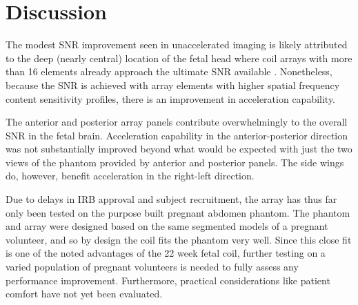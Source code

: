 \chapter{Discussion}
The modest SNR improvement seen in unaccelerated imaging is likely attributed to the deep (nearly central) location of
the fetal head where coil arrays with more than 16 elements already approach the ultimate SNR available
\cite{Wiesinger2004}. Nonetheless, because the SNR is achieved with array elements with higher spatial frequency
content sensitivity profiles, there is an improvement in acceleration capability.

The anterior and posterior array panels contribute overwhelmingly to the overall SNR in the fetal brain. Acceleration
capability in the anterior-posterior direction was not substantially improved beyond what would be expected with just
the two views of the phantom provided by anterior and posterior panels. The side wings do, however, benefit acceleration
in the right-left direction.

Due to delays in IRB approval and subject recruitment, the array has thus far only been tested on the purpose built
pregnant abdomen phantom.  The phantom and array were designed based on the same segmented models of a pregnant
volunteer, and so by design the coil fits the phantom very well. Since this close fit is one of the noted advantages of
the 22 week fetal coil, further testing on a varied population of pregnant volunteers is needed to fully assess any
performance improvement. Furthermore, practical considerations like patient comfort have not yet been evaluated.
